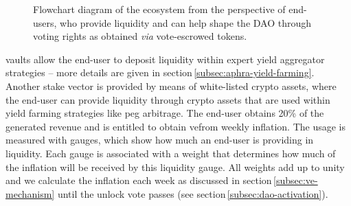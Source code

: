 \begin{figure}[p]
    \vspace*{-2cm}
    \caption{Flowchart diagram of the \aphra ecosystem from the perspective of end-users, who provide liquidity and can help shape the DAO through voting rights as obtained \textit{via} vote-escrowed \aphra tokens.}
    \label{fig:ae-flow}
\end{figure}

\aphra vaults allow the end-user to deposit liquidity within expert yield aggregator strategies -- more details are given in section\,\ref{subsec:aphra-yield-farming}.
Another stake vector is provided by means of white-listed crypto assets, where the end-user can provide liquidity through crypto assets that are used within yield farming strategies like peg arbitrage.
The end-user obtains 20\% of the generated revenue and is entitled to obtain ve\aphra from weekly inflation.
The usage is measured with gauges, which show how much an end-user is providing in liquidity.
Each gauge is associated with a weight that determines how much of the inflation will be received by this liquidity gauge.
All weights add up to unity and we calculate the inflation each week as discussed in section\,\ref{subsec:ve-mechanism} until the unlock vote passes (see section\,\ref{subsec:dao-activation}).\\[-1em]

